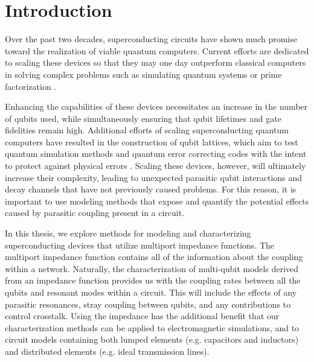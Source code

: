 \chapter{Introduction}

Over the past two decades, superconducting circuits have shown much promise toward the realization of viable quantum computers. Current efforts are dedicated to scaling these devices so that they may one day outperform classical computers in solving complex problems such as simulating quantum systems \cite{Feynman1982} or prime factorization \cite{prime}. 

Enhancing the capabilities of these devices necessitates an increase in the number of qubits used, while simultaneously ensuring that qubit lifetimes and gate fidelities remain high. Additional efforts of scaling superconducting quantum computers have resulted in the construction of qubit lattices, which aim to test quantum simulation methods \cite{evidence_utility,karamlou2023probing,Barends2016} and quantum error correcting codes with the intent to protect against physical errors \cite{google_surface, surface17}. Scaling these devices, however, will ultimately increase their complexity, leading to unexpected parasitic qubit interactions and decay channels that have not previously caused problems. For this reason, it is important to use modeling methods that expose and quantify the potential effects caused by parasitic coupling present in a circuit.

In this thesis, we explore methods for modeling and characterizing superconducting devices that utilize multiport impedance functions. The multiport impedance function contains all of the information about the coupling within a network. Naturally, the characterization of multi-qubit models derived from an impedance function provides us with the coupling rates between all the qubits and resonant modes within a circuit. This will include the effects of any parasitic resonances, stray coupling between qubits, and any contributions to control crosstalk. Using the impedance has the additional benefit that our characterization methods can be applied to electromagnetic simulations, and to circuit models containing both lumped elements (e.g. capacitors and inductors) and distributed elements (e.g. ideal transmission lines).

